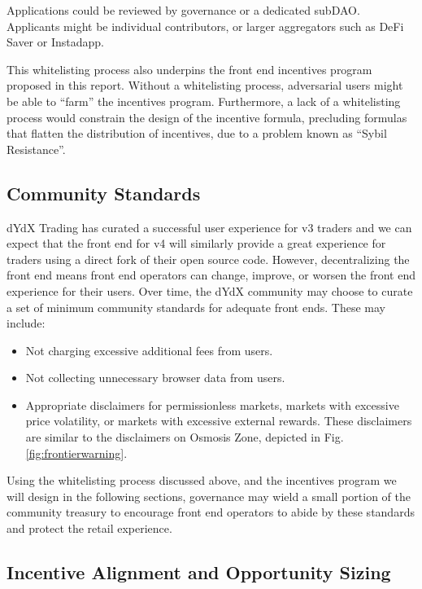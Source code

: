         Applications could be reviewed by governance or a dedicated subDAO. Applicants might be individual contributors, or larger aggregators such as DeFi Saver or Instadapp. 

        This whitelisting process also underpins the front end incentives program proposed in this report. Without a whitelisting process, adversarial users might be able to ``farm'' the incentives program. Furthermore, a lack of a whitelisting process would constrain the design of the incentive formula, precluding formulas that flatten the distribution of incentives, due to a problem known as ``Sybil Resistance''.

    \subsection{Community Standards}

        dYdX Trading has curated a successful user experience for v3 traders and we can expect that the front end for v4 will similarly provide a great experience for traders using a direct fork of their open source code. However, decentralizing the front end means front end operators can change, improve, or worsen the front end experience for their users. Over time, the dYdX community may choose to curate a set of minimum community standards for adequate front ends. These may include:

        \begin{itemize}
            \item Not charging excessive additional fees from users.
            \item Not collecting unnecessary browser data from users.
            \item Appropriate disclaimers for permissionless markets, markets with excessive price volatility, or markets with excessive external rewards. These disclaimers are similar to the disclaimers on Osmosis Zone, depicted in Fig. \ref{fig:frontierwarning}.
        \end{itemize}

        Using the whitelisting process discussed above, and the incentives program we will design in the following sections, governance may wield a small portion of the community treasury to encourage front end operators to abide by these standards and protect the retail experience.

    \subsection{Incentive Alignment and Opportunity Sizing}

